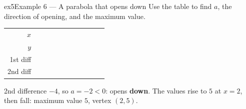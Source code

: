 \documentclass[11pt]{article}
\begin{document}
\begin{example}{ex5}{Example 6 --- A parabola that opens down}
Use the table to find $a$, the direction of opening, and the maximum value.
\begin{center}\renewcommand{\arraystretch}{1.15}\setlength{\tabcolsep}{2pt}\begin{tabular}{r|>{\centering\arraybackslash}p{0.62cm}>{\centering\arraybackslash}p{0.62cm}>{\centering\arraybackslash}p{0.62cm}>{\centering\arraybackslash}p{0.62cm}>{\centering\arraybackslash}p{0.62cm}>{\centering\arraybackslash}p{0.62cm}>{\centering\arraybackslash}p{0.62cm}>{\centering\arraybackslash}p{0.62cm}>{\centering\arraybackslash}p{0.62cm}>{\centering\arraybackslash}p{0.62cm}}
$x$ & \multicolumn{2}{c}{\colorbox{iagreen}{\makebox[1.12cm]{\strut \color{white}\bfseries $0$}}} & \multicolumn{2}{c}{\colorbox{iagreen}{\makebox[1.12cm]{\strut \color{white}\bfseries $1$}}} & \multicolumn{2}{c}{\colorbox{iagreen}{\makebox[1.12cm]{\strut \color{white}\bfseries $2$}}} & \multicolumn{2}{c}{\colorbox{iagreen}{\makebox[1.12cm]{\strut \color{white}\bfseries $3$}}} & \multicolumn{2}{c}{\colorbox{iagreen}{\makebox[1.12cm]{\strut \color{white}\bfseries $4$}}} \\[2pt]
$y$ & \multicolumn{2}{c}{\colorbox{keybg}{\makebox[1.12cm]{\strut $-3$}}} & \multicolumn{2}{c}{\colorbox{keybg}{\makebox[1.12cm]{\strut $3$}}} & \multicolumn{2}{c}{\colorbox{keybg}{\makebox[1.12cm]{\strut $5$}}} & \multicolumn{2}{c}{\colorbox{keybg}{\makebox[1.12cm]{\strut $3$}}} & \multicolumn{2}{c}{\colorbox{keybg}{\makebox[1.12cm]{\strut $-3$}}} \\[2pt]
\textcolor{exblue}{\scriptsize 1st diff} & & \multicolumn{2}{c}{\colorbox{exbg}{\makebox[1.12cm]{\strut \textcolor{exblue}{$+6$}}}} & \multicolumn{2}{c}{\colorbox{exbg}{\makebox[1.12cm]{\strut \textcolor{exblue}{$+2$}}}} & \multicolumn{2}{c}{\colorbox{exbg}{\makebox[1.12cm]{\strut \textcolor{exblue}{$-2$}}}} & \multicolumn{2}{c}{\colorbox{exbg}{\makebox[1.12cm]{\strut \textcolor{exblue}{$-6$}}}} & \\[2pt]
\textcolor{qorange}{\scriptsize 2nd diff} & & & \multicolumn{2}{c}{\colorbox{qbg}{\makebox[1.12cm]{\strut \textcolor{qorange!70!black}{$-4$}}}} & \multicolumn{2}{c}{\colorbox{qbg}{\makebox[1.12cm]{\strut \textcolor{qorange!70!black}{$-4$}}}} & \multicolumn{2}{c}{\colorbox{qbg}{\makebox[1.12cm]{\strut \textcolor{qorange!70!black}{$-4$}}}} & & \\
\end{tabular}\end{center}
\soln 2nd difference $-4$, so $a=-2<0$: opens \textbf{down}. The values rise to $5$ at $x=2$, then fall: maximum value $5$, vertex $(2,5)$.

\end{example}
\end{document}
